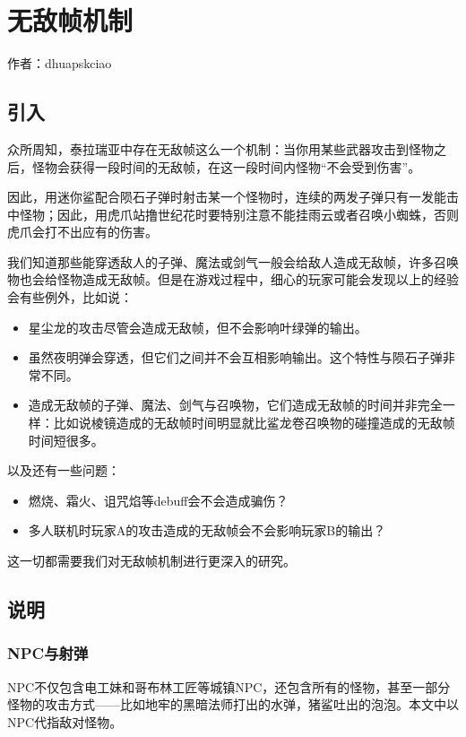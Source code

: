 \chapter{无敌帧机制}
\begin{center}
作者：dhuapskciao
\end{center}
\section{引入}
众所周知，泰拉瑞亚中存在无敌帧这么一个机制：当你用某些武器攻击到怪物之后，怪物会获得一段时间的无敌帧，在这一段时间内怪物“不会受到伤害”。

因此，用迷你鲨配合陨石子弹时射击某一个怪物时，连续的两发子弹只有一发能击中怪物；因此，用虎爪站撸世纪花时要特别注意不能挂雨云或者召唤小蜘蛛，否则虎爪会打不出应有的伤害。

我们知道那些能穿透敌人的子弹、魔法或剑气一般会给敌人造成无敌帧，许多召唤物也会给怪物造成无敌帧。但是在游戏过程中，细心的玩家可能会发现以上的经验会有些例外，比如说：
\begin{itemize}
\item 星尘龙的攻击尽管会造成无敌帧，但不会影响叶绿弹的输出。
\item 虽然夜明弹会穿透，但它们之间并不会互相影响输出。这个特性与陨石子弹非常不同。
\item 造成无敌帧的子弹、魔法、剑气与召唤物，它们造成无敌帧的时间并非完全一样：比如说棱镜造成的无敌帧时间明显就比鲨龙卷召唤物的碰撞造成的无敌帧时间短很多。
\end{itemize}

以及还有一些问题：
\begin{itemize}
\item 燃烧、霜火、诅咒焰等debuff会不会造成骗伤？
\item 多人联机时玩家A的攻击造成的无敌帧会不会影响玩家B的输出？
\end{itemize}

这一切都需要我们对无敌帧机制进行更深入的研究。

\section{说明}
\subsection{NPC与射弹}
NPC不仅包含电工妹和哥布林工匠等城镇NPC，还包含所有的怪物，甚至一部分怪物的攻击方式——比如地牢的黑暗法师打出的水弹，猪鲨吐出的泡泡。本文中以NPC代指敌对怪物。

